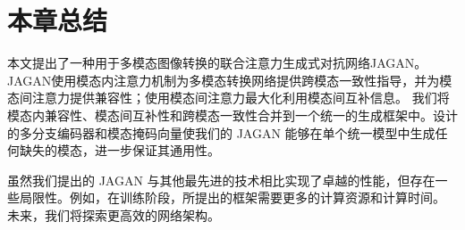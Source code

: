 

\section{本章总结}

本文提出了一种用于多模态图像转换的联合注意力生成式对抗网络JAGAN。 JAGAN使用模态内注意力机制为多模态转换网络提供跨模态一致性指导，并为模态间注意力提供兼容性；使用模态间注意力最大化利用模态间互补信息。 我们将模态内兼容性、模态间互补性和跨模态一致性合并到一个统一的生成框架中。设计的多分支编码器和模态掩码向量使我们的 JAGAN 能够在单个统一模型中生成任何缺失的模态，进一步保证其通用性。

虽然我们提出的 JAGAN 与其他最先进的技术相比实现了卓越的性能，但存在一些局限性。例如，在训练阶段，所提出的框架需要更多的计算资源和计算时间。 未来，我们将探索更高效的网络架构。
